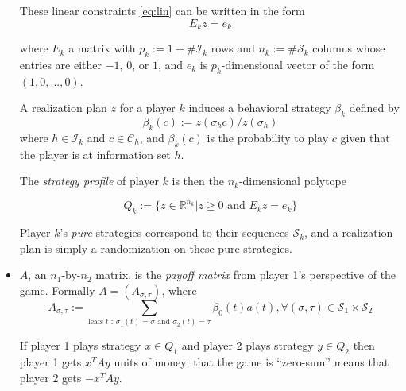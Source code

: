 \documentclass{article} %
\begin{document}
\begin{itemize}
These linear constraints \eqref{eq:lin} can be written in the form
\begin{equation}
  E_k z = e_k
\end{equation}

where $E_k$ a matrix with $p_k := 1 + \#\mathcal{I}_k$ rows and $n_k := \#\mathcal{S}_k$ columns whose entries are either $-1$, $0$, or $1$, and $e_k$ is $p_k$-dimensional vector of the form $(1, 0, ..., 0)$.

A realization plan $z$ for a player $k$ induces a behavioral strategy $\beta_k$ defined by
\begin{equation}
  \beta_k(c) := z(\sigma_hc)/z(\sigma_h)
\end{equation}
where $h \in \mathcal{I}_k$ and $c \in \mathcal{C}_h$, and $\beta_k(c)$ is the probability to play $c$ given that the player is at information set $h$.

The \textit{strategy profile} of player $k$ is then the $n_k$-dimensional polytope

\begin{equation}
  Q_k := \{z \in \mathbb{R}^{n_k}| z \ge 0\text{ and }E_kz = e_k\}
  \label{eq:poly}
\end{equation}

Player $k$'s \textit{pure} strategies correspond to their sequences $\mathcal{S}_k$, and a realization plan is simply a randomization on these pure strategies.

\item $A$, an $n_1$-by-$n_2$ matrix, is the \textit{payoff matrix} from player 1's perspective of the game. Formally $A = (A_{\sigma,\tau})$, where
  \begin{equation}
    A_{\sigma,\tau} := \sum_{\text{leafs }t\text{ : } \sigma_1(t) = \sigma\text{ and } \sigma_2(t) = \tau}{\beta_0(t)a(t)}, \forall (\sigma, \tau) \in \mathcal{S}_1 \times \mathcal{S}_2
  \end{equation}

If player 1 plays strategy $x \in Q_1$ and player 2 plays strategy $y \in Q_2$ then player 1 gets $x^TAy$ units of money; that the game is ``zero-sum'' means that player 2 gets $-x^TAy$.

\end{itemize}
\end{document}
